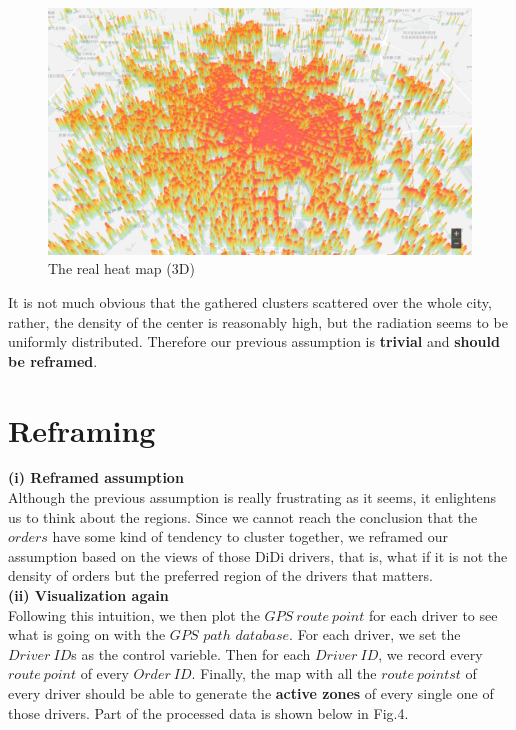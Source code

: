 \documentclass[10pt,journal]{IEEEtran}
\begin{document}
\begin{figure}[!ht]
    \centering
    \includegraphics[width=1.0\columnwidth]{Fig/3D.png}
    \caption{The real heat map (3D)}
 \end{figure}

It is not much obvious that the gathered clusters scattered over the whole city, rather, the density of the center is reasonably high, but the radiation seems to be uniformly distributed. Therefore our previous assumption is \textbf{trivial} and \textbf{should be reframed}. \\
  
\section{Reframing}

\textbf{(i) Reframed assumption}\\

Although the previous assumption is really frustrating as it seems, it enlightens us to think about the regions. Since we cannot reach the conclusion that the $orders$ have some kind of tendency to cluster together, we reframed our assumption based on the views of those DiDi drivers, that is, what if it is not the density of orders but the preferred region of the drivers that matters.\\

\textbf{(ii) Visualization again}\\

Following this intuition, we then plot the $GPS\ route\ point$ for each driver to see what is going on with the $GPS$ $path$ $database$. For each driver, we set the $Driver\ ID$s as the control varieble. Then for each $Driver\ ID$, we record every $route\ point$ of every $Order\ ID$. Finally, the map with all the $route\ pointst$ of every driver should be able to generate the \textbf{active zones} of every single one of those drivers. Part of the processed data is shown below in Fig.4.
\end{document}
